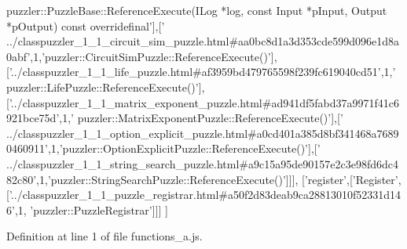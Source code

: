 \begin{DoxyCode}
{      puzzler::PuzzleBase::ReferenceExecute(ILog *log, const Input *pInput, Output *pOutput) const overridefinal'}],[\textcolor{stringliteral}{'
      ../classpuzzler\_1\_1\_circuit\_sim\_puzzle.html#aa0bc8d1a3d353cde599d096e1d8a0abf'},1,\textcolor{stringliteral}{'puzzler::CircuitSimPuzzle::ReferenceExecute()'}],
      [\textcolor{stringliteral}{'../classpuzzler\_1\_1\_life\_puzzle.html#af3959bd479765598f239fc619040cd51'},1,\textcolor{stringliteral}{'
      puzzler::LifePuzzle::ReferenceExecute()'}],[\textcolor{stringliteral}{'../classpuzzler\_1\_1\_matrix\_exponent\_puzzle.html#ad941df5fabd37a9971f41c6921bce75d'},1,\textcolor{stringliteral}{'
      puzzler::MatrixExponentPuzzle::ReferenceExecute()'}],[\textcolor{stringliteral}{'
      ../classpuzzler\_1\_1\_option\_explicit\_puzzle.html#a0cd401a385d8bf341468a76890460911'},1,\textcolor{stringliteral}{'puzzler::OptionExplicitPuzzle::ReferenceExecute()'}],[\textcolor{stringliteral}{'
      ../classpuzzler\_1\_1\_string\_search\_puzzle.html#a9c15a95de90157e2c3e98fd6dc482c80'},1,\textcolor{stringliteral}{'puzzler::StringSearchPuzzle::ReferenceExecute()'}]]],
  [\textcolor{stringliteral}{'register'},[\textcolor{stringliteral}{'Register'},[\textcolor{stringliteral}{'../classpuzzler\_1\_1\_puzzle\_registrar.html#a50f2d83deab9ca28813010f52331d146'},1,\textcolor{stringliteral}{
      'puzzler::PuzzleRegistrar'}]]]
]
\end{DoxyCode}


Definition at line 1 of file functions\+\_\+a.\+js.

